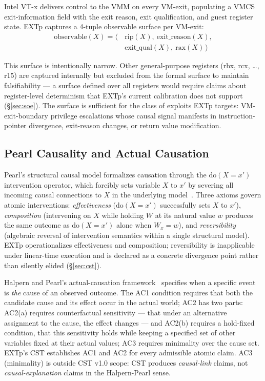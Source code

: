 \documentclass[conference]{IEEEtran}
\newcommand{\dox}[1]{\text{do}(X{=}#1)}
\begin{document}
Intel VT-x delivers control to the VMM on every VM-exit, populating
a VMCS exit-information field with the exit reason, exit
qualification, and guest register state. EXTp captures a 4-tuple
observable surface per VM-exit:
\begin{equation}
\begin{aligned}
\text{observable}(X) = \langle\,&\text{rip}(X),\ \text{exit\_reason}(X), \\
                                &\text{exit\_qual}(X),\ \text{rax}(X)\,\rangle
\end{aligned}
\end{equation}

This surface is intentionally narrow. Other general-purpose registers
(rbx, rcx, \ldots, r15) are captured internally but excluded from the
formal surface to maintain falsifiability --- a surface defined over
all registers would require claims about register-level determinism
that EXTp's current calibration does not support (\S\ref{sec:soe}).
The surface is sufficient for the class of exploits EXTp targets:
VM-exit-boundary privilege escalations whose causal signal manifests
in instruction-pointer divergence, exit-reason changes, or return
value modification.

\subsection{Pearl Causality and Actual Causation}

Pearl's structural causal model formalizes causation through the
$\dox{x'}$ intervention operator, which forcibly sets variable $X$
to $x'$ by severing all incoming causal connections to $X$ in the
underlying model~\cite{pearl2009causality}. Three axioms govern
atomic interventions: \emph{effectiveness} ($\dox{x'}$ successfully
sets $X$ to $x'$), \emph{composition} (intervening on $X$ while
holding $W$ at its natural value $w$ produces the same outcome as
$\dox{x'}$ alone when $W_x = w$), and \emph{reversibility}
(algebraic reversal of intervention semantics within a single
structural model). EXTp operationalizes effectiveness and
composition; reversibility is inapplicable under linear-time
execution and is declared as a concrete divergence point rather than
silently elided (\S\ref{sec:cst}).

Halpern and Pearl's actual-causation
framework~\cite{halpern2005causes} specifies when a specific event
is \emph{the} cause of an observed outcome. The AC1 condition
requires that both the candidate cause and its effect occur in the
actual world; AC2 has two parts: AC2(a) requires counterfactual
sensitivity --- that under an alternative assignment to the cause,
the effect changes --- and AC2(b) requires a hold-fixed condition,
that this sensitivity holds while keeping a specified set of other
variables fixed at their actual values; AC3 requires minimality over
the cause set. EXTp's CST establishes AC1 and AC2 for every
admissible atomic claim. AC3 (minimality) is outside CST v1.0 scope:
CST produces \emph{causal-link} claims, not \emph{causal-explanation}
claims in the Halpern-Pearl sense.
\end{document}
